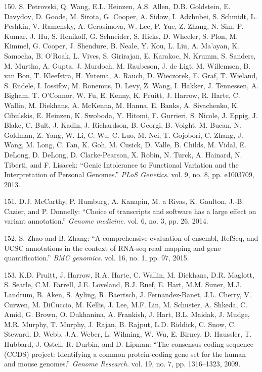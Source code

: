\documentclass[12pt,twoside]{reedthesis}
\theoremstyle{definition}
\theoremstyle{definition}
\theoremstyle{remark}
\begin{document}
  \hypertarget{ref-Petrovski2013}{}
  150. S. Petrovski, Q. Wang, E.L. Heinzen, A.S. Allen, D.B. Goldstein, E.
  Davydov, D. Goode, M. Sirota, G. Cooper, A. Sidow, I. Adzhubei, S.
  Schmidt, L. Peshkin, V. Ramensky, A. Gerasimova, W. Lee, P. Yue, Z.
  Zhang, N. Sim, P. Kumar, J. Hu, S. Henikoff, G. Schneider, S. Hicks, D.
  Wheeler, S. Plon, M. Kimmel, G. Cooper, J. Shendure, B. Neale, Y. Kou,
  L. Liu, A. Ma'ayan, K. Samocha, B. O'Roak, L. Vives, S. Girirajan, E.
  Karakoc, N. Krumm, S. Sanders, M. Murtha, A. Gupta, J. Murdoch, M.
  Raubeson, J. de Ligt, M. Willemsen, B. van Bon, T. Kleefstra, H. Yntema,
  A. Rauch, D. Wieczorek, E. Graf, T. Wieland, S. Endele, I. Iossifov, M.
  Ronemus, D. Levy, Z. Wang, I. Hakker, J. Tennessen, A. Bigham, T.
  O'Connor, W. Fu, E. Kenny, K. Pruitt, J. Harrow, R. Harte, C. Wallin, M.
  Diekhans, A. McKenna, M. Hanna, E. Banks, A. Sivachenko, K. Cibulskis,
  E. Heinzen, K. Swoboda, Y. Hitomi, F. Gurrieri, S. Nicole, J. Eppig, J.
  Blake, C. Bult, J. Kadin, J. Richardson, B. Georgi, B. Voight, M. Bucan,
  N. Goldman, Z. Yang, W. Li, C. Wu, C. Luo, M. Nei, T. Gojobori, C.
  Zhang, J. Wang, M. Long, C. Fan, K. Goh, M. Cusick, D. Valle, B. Childs,
  M. Vidal, E. DeLong, D. DeLong, D. Clarke-Pearson, X. Robin, N. Turck,
  A. Hainard, N. Tiberti, and F. Lisacek: ``Genic Intolerance to
  Functional Variation and the Interpretation of Personal Genomes.''
  \emph{PLoS Genetics}. vol. 9, no. 8, pp. e1003709, 2013.
  
  \hypertarget{ref-McCarthy2014}{}
  151. D.J. McCarthy, P. Humburg, A. Kanapin, M. a Rivas, K. Gaulton,
  J.-B. Cazier, and P. Donnelly: ``Choice of transcripts and software has
  a large effect on variant annotation.'' \emph{Genome medicine}. vol. 6,
  no. 3, pp. 26, 2014.
  
  \hypertarget{ref-Zhao2015}{}
  152. S. Zhao and B. Zhang: ``A comprehensive evaluation of ensembl,
  RefSeq, and UCSC annotations in the context of RNA-seq read mapping and
  gene quantification.'' \emph{BMC genomics}. vol. 16, no. 1, pp. 97,
  2015.
  
  \hypertarget{ref-Pruitt2009}{}
  153. K.D. Pruitt, J. Harrow, R.A. Harte, C. Wallin, M. Diekhans, D.R.
  Maglott, S. Searle, C.M. Farrell, J.E. Loveland, B.J. Ruef, E. Hart,
  M.M. Suner, M.J. Landrum, B. Aken, S. Ayling, R. Baertsch, J.
  Fernandez-Banet, J.L. Cherry, V. Curwen, M. DiCuccio, M. Kellis, J. Lee,
  M.F. Lin, M. Schuster, A. Shkeda, C. Amid, G. Brown, O. Dukhanina, A.
  Frankish, J. Hart, B.L. Maidak, J. Mudge, M.R. Murphy, T. Murphy, J.
  Rajan, B. Rajput, L.D. Riddick, C. Snow, C. Steward, D. Webb, J.A.
  Weber, L. Wilming, W. Wu, E. Birney, D. Haussler, T. Hubbard, J. Ostell,
  R. Durbin, and D. Lipman: ``The consensus coding sequence (CCDS)
  project: Identifying a common protein-coding gene set for the human and
  mouse genomes.'' \emph{Genome Research}. vol. 19, no. 7, pp. 1316--1323,
  2009.
  
\end{document}
